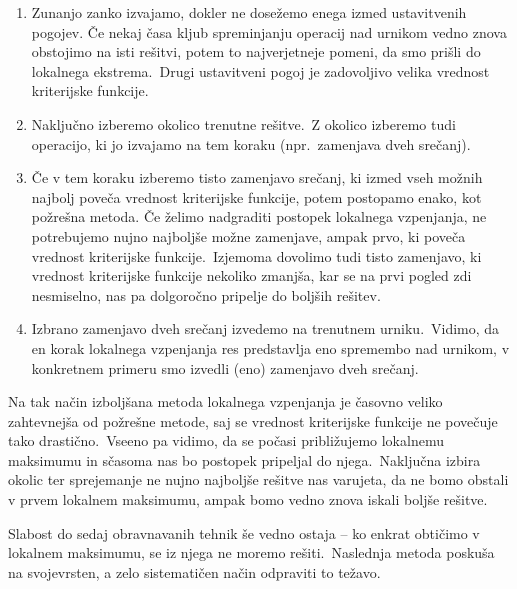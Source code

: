 \documentclass[a4paper,10pt]{article}
\begin{document}
\begin{enumerate}
  \item  Zunanjo zanko izvajamo, dokler ne dosežemo enega izmed ustavitvenih pogojev.
   Če nekaj časa kljub spreminjanju operacij nad urnikom vedno znova obstojimo na isti
   rešitvi, potem to najverjetneje pomeni, da smo prišli do lokalnega ekstrema.\ Drugi
   ustavitveni pogoj je zadovoljivo velika vrednost kriterijske funkcije.

  \item Naključno izberemo okolico trenutne rešitve.\ Z okolico izberemo tudi operacijo,
   ki jo izvajamo na tem koraku (npr.\ zamenjava dveh srečanj).

  \item Če v tem koraku izberemo tisto zamenjavo srečanj, ki izmed vseh možnih najbolj
   poveča vrednost kriterijske funkcije, potem postopamo enako, kot požrešna metoda. Če
   želimo nadgraditi postopek lokalnega vzpenjanja, ne potrebujemo nujno najboljše možne
   zamenjave, ampak prvo, ki poveča vrednost kriterijske funkcije.\ Izjemoma dovolimo tudi
   tisto zamenjavo, ki vrednost kriterijske funkcije nekoliko zmanjša, kar se na prvi
   pogled zdi nesmiselno, nas pa dolgoročno pripelje do boljših rešitev.

   \item Izbrano zamenjavo dveh srečanj izvedemo na trenutnem urniku.\ Vidimo, da en korak
   lokalnega vzpenjanja res predstavlja eno spremembo nad urnikom, v konkretnem primeru
   smo izvedli (eno) zamenjavo dveh srečanj.
\end{enumerate}

\noindent Na tak način izboljšana metoda lokalnega vzpenjanja je časovno veliko zahtevnejša od
požrešne metode, saj se vrednost kriterijske funkcije ne povečuje tako drastično.\ Vseeno
pa vidimo, da se počasi približujemo lokalnemu maksimumu in sčasoma nas bo postopek
pripeljal do njega.\ Naključna izbira okolic ter sprejemanje ne nujno najboljše rešitve
nas varujeta, da ne bomo obstali v prvem lokalnem maksimumu, ampak bomo vedno znova
iskali boljše rešitve.

Slabost do sedaj obravnavanih tehnik še vedno ostaja -- ko enkrat obtičimo v lokalnem
maksimumu, se iz njega ne moremo rešiti.\ Naslednja metoda poskuša na svojevrsten, a zelo
sistematičen način odpraviti to težavo.
\end{document}

